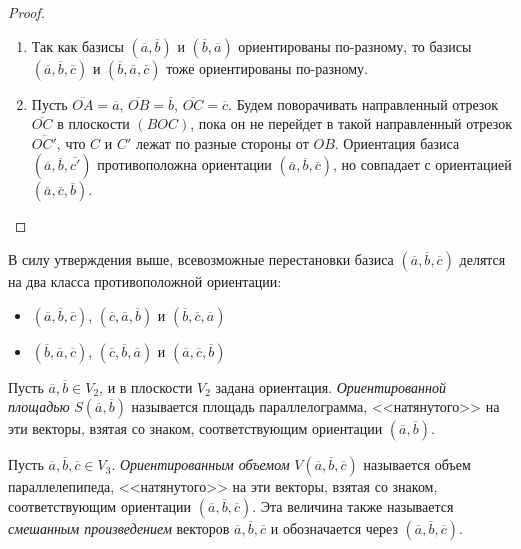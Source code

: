 \begin{proof}~
	\begin{enumerate}
		\item Так как базисы $(\overline{a}, \overline{b})$ и $(\overline{b}, \overline{a})$ ориентированы по-разному, то базисы $(\overline{a}, \overline{b}, \overline{c})$ и $(\overline{b}, \overline{a}, \overline{c})$ тоже ориентированы по-разному. \pagebreak
		\item Пусть $\overline{OA} = \overline{a}$, $\overline{OB} = \overline{b}$, $\overline{OC} = \overline{c}$. Будем поворачивать направленный отрезок $\overline{OC}$ в плоскости $(BOC)$, пока он не перейдет в такой направленный отрезок $\overline{OC'}$, что $C$ и $C'$ лежат по разные стороны от $OB$. Ориентация базиса $(\overline{a}, \overline{b}, \overline{c'})$ противоположна ориентации $(\overline{a}, \overline{b}, \overline{c})$, но совпадает с ориентацией $(\overline{a}, \overline{c}, \overline{b})$.\qedhere
	\end{enumerate}
\end{proof}

\begin{note}
	В силу утверждения выше, всевозможные перестановки базиса $(\overline{a}, \overline{b}, \overline{c})$ делятся на два класса противоположной ориентации:
	\begin{itemize}
		\item $(\overline{a}, \overline{b}, \overline{c})$, $(\overline{c}, \overline{a}, \overline{b})$ и $(\overline{b}, \overline{c}, \overline{a})$
		\item $(\overline{b}, \overline{a}, \overline{c})$, $(\overline{c}, \overline{b}, \overline{a})$ и $(\overline{a}, \overline{c}, \overline{b})$
	\end{itemize}
\end{note}

\begin{definition}
	Пусть $\overline{a}, \overline{b} \in V_2$, и в плоскости $V_2$ задана ориентация. \textit{Ориентированной площадью} $S(\overline{a}, \overline{b})$ называется площадь параллелограмма, <<натянутого>> на эти векторы, взятая со знаком, соответствующим ориентации $(\overline{a}, \overline{b})$.
\end{definition}

\begin{definition}
	Пусть $\overline{a}, \overline{b}, \overline{c} \in V_3$. \textit{Ориентированным объемом} $V(\overline{a}, \overline{b}, \overline{c})$ называется объем параллелепипеда, <<натянутого>> на эти векторы, взятая со знаком, соответствующим ориентации $(\overline{a}, \overline{b}, \overline{c})$. Эта величина также называется \textit{смешанным произведением} векторов $\overline{a}, \overline{b}, \overline{c}$ и обозначается через $(\overline{a}, \overline{b}, \overline{c})$.
\end{definition}

